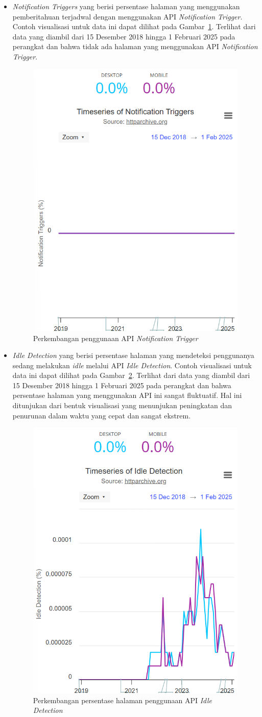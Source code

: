 \begin{itemize}
    \item \textit{Notification Triggers} yang berisi persentase halaman yang menggunakan pemberitahuan terjadwal dengan menggunakan API \textit{Notification Trigger}. Contoh visualisasi untuk data ini dapat dilihat pada Gambar~\ref{fig:notif}. Terlihat dari data yang diambil dari 15 Desember 2018 hingga 1 Februari 2025 pada perangkat \desktop dan \mobile bahwa tidak ada halaman \web yang menggunakan API \textit{Notification Trigger}.
    \begin{figure}[H]
        \centering
        \includegraphics[width=0.4\linewidth]{Gambar/Contoh Notif.png}
        \caption{Perkembangan penggunaan API \textit{Notification Trigger}}
        \label{fig:notif}
    \end{figure}

    \item \textit{Idle Detection} yang berisi persentase halaman yang mendeteksi penggunanya sedang melakukan \textit{idle} melalui API \textit{Idle Detection}. Contoh visualisasi untuk data ini dapat dilihat pada Gambar~\ref{fig:idle}. Terlihat dari data yang diambil dari 15 Desember 2018 hingga 1 Februari 2025 pada perangkat \desktop dan \mobile bahwa persentase halaman yang menggunakan API ini sangat fluktuatif. Hal ini ditunjukan dari bentuk visualisasi yang menunjukan peningkatan dan penurunan dalam waktu yang cepat dan sangat ekstrem.
    \begin{figure}[H]
        \centering
        \includegraphics[width=0.4\linewidth]{Gambar/Contoh Idle.png}
        \caption{Perkembangan persentase halaman \web penggunaan API \textit{Idle Detection}}
        \label{fig:idle}
    \end{figure}
\end{itemize}


